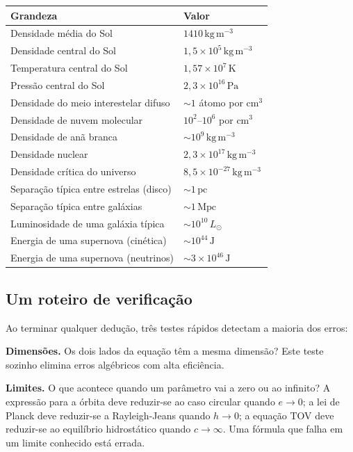 \documentclass[11pt,a4paper]{article}
\begin{document}
\begin{tabular}{>{\raggedright\arraybackslash}p{}>{\raggedright\arraybackslash}p{}}
\toprule
Grandeza & Valor \\
\midrule
Densidade média do Sol & $1410\,\mathrm{kg\,m^{-3}}$ \\
Densidade central do Sol & $1{,}5\times10^{5}\,\mathrm{kg\,m^{-3}}$ \\
Temperatura central do Sol & $1{,}57\times10^{7}\,\mathrm{K}$ \\
Pressão central do Sol & $2{,}3\times10^{16}\,\mathrm{Pa}$ \\
Densidade do meio interestelar difuso & $\sim1$ átomo por $\mathrm{cm^{3}}$ \\
Densidade de nuvem molecular & $10^{2}$--$10^{6}$ por $\mathrm{cm^{3}}$ \\
Densidade de anã branca & $\sim10^{9}\,\mathrm{kg\,m^{-3}}$ \\
Densidade nuclear & $2{,}3\times10^{17}\,\mathrm{kg\,m^{-3}}$ \\
Densidade crítica do universo & $8{,}5\times10^{-27}\,\mathrm{kg\,m^{-3}}$ \\
Separação típica entre estrelas (disco) & $\sim1\,\mathrm{pc}$ \\
Separação típica entre galáxias & $\sim1\,\mathrm{Mpc}$ \\
Luminosidade de uma galáxia típica & $\sim10^{10}\,L_\odot$ \\
Energia de uma supernova (cinética) & $\sim10^{44}\,\mathrm{J}$ \\
Energia de uma supernova (neutrinos) & $\sim3\times10^{46}\,\mathrm{J}$ \\
\bottomrule
\end{tabular}

\subsection*{Um roteiro de verificação}

Ao terminar qualquer dedução, três testes rápidos detectam a maioria dos erros:

\textbf{Dimensões.} Os dois lados da equação têm a mesma dimensão? Este teste sozinho elimina erros algébricos com alta eficiência.

\textbf{Limites.} O que acontece quando um parâmetro vai a zero ou ao infinito? A expressão para a órbita deve reduzir-se ao caso circular quando $e\to0$; a lei de Planck deve reduzir-se a Rayleigh-Jeans quando $h\to0$; a equação TOV deve reduzir-se ao equilíbrio hidrostático quando $c\to\infty$. Uma fórmula que falha em um limite conhecido está errada.
\end{document}
